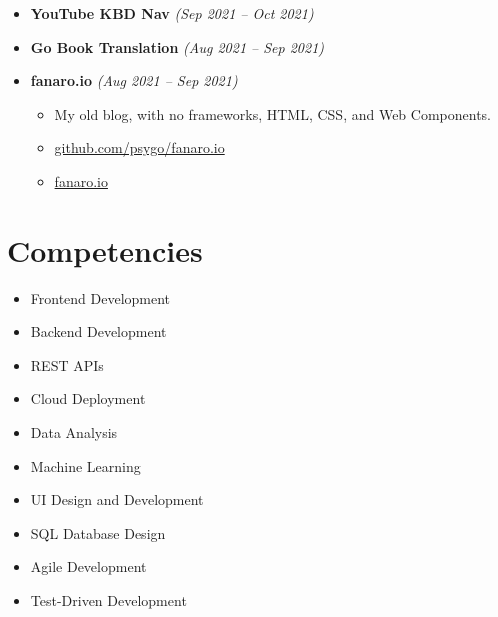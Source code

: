 \documentclass[14pt]{extarticle}
\renewcommand{\_}{\leavevmode\kern.06em\vbox{\hrule width.425em}}
\begin{document}
\begin{itemize}
  \item \textbf{YouTube KBD Nav} \textit{(Sep 2021 -- Oct 2021)}
  
  \item \textbf{Go Book Translation} \textit{(Aug 2021 -- Sep 2021)}
    
  \item \textbf{fanaro.io} \textit{(Aug 2021 -- Sep 2021)}
    \begin{itemize}
      \item My old blog, with no frameworks, HTML, CSS, and Web Components.
      \item \href{https://github.com/psygo/fanaro.io}{github.com/psygo/fanaro.io}
      \item \href{https://psygo.github.io/fanaro.io/}{fanaro.io}
    \end{itemize}
\end{itemize}

\section{Competencies}

\begin{itemize}
  \item Frontend Development
  \item Backend Development
  \item REST APIs
  \item Cloud Deployment
  \item Data Analysis
  \item Machine Learning
  \item UI Design and Development
  \item SQL Database Design
  \item Agile Development
  \item Test-Driven Development
\end{itemize}
\end{document}
